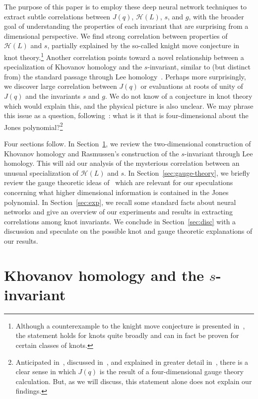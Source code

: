 \documentclass[11pt]{article}
\numberwithin{equation}{section}
\begin{document}
The purpose of this paper is to employ these deep neural network techniques to extract subtle correlations between $J(q)$, $\mathcal{H}(L)$, $s$, and $g$, with the broader goal of understanding the properties of each invariant that are surprising from a dimensional perspective.
We find strong correlation between properties of $\mathcal{H}(L)$ and $s$, partially explained by the so-called knight move conjecture in knot theory.\footnote{
Although a counterexample to the knight move conjecture is presented in~\cite{manolescu2018knight}, the statement holds for knots quite broadly and can in fact be proven for certain classes of knots.}
Another correlation points toward a novel relationship between a specialization of Khovanov homology and the $s$-invariant, similar to (but distinct from) the standard passage through Lee homology~\cite{rasmussen2010khovanov}.
Perhaps more surprisingly, we discover large correlation between $J(q)$ or evaluations at roots of unity of $J(q)$ and the invariants $s$ and $g$.
We do not know of a conjecture in knot theory which would explain this, and the physical picture is also unclear.
We may phrase this issue as a question, following~\cite{Witten:1988hf}: what is it that is four-dimensional about the Jones polynomial?\footnote{Anticipated in~\cite{Witten:2010cx,Witten:2010zr}, discussed in~\cite{Witten:2011zz}, and explained in greater detail in~\cite{Gaiotto:2011nm}, there is a clear sense in which $J(q)$ is the result of a four-dimensional gauge theory calculation.
But, as we will discuss, this statement alone does not explain our findings.}

Four sections follow.
In Section~\ref{sec:khovanov}, we review the two-dimensional construction of Khovanov homology and Rasmussen's construction of the $s$-invariant through Lee homology.
This will aid our analysis of the mysterious correlation between an unusual specialization of $\mathcal{H}(L)$ and $s$.
In Section~\ref{sec:gauge-theory}, we briefly review the gauge theoretic ideas of~\cite{Witten:1988hf,Witten:2011zz} which are relevant for our speculations concerning what higher dimensional information is contained in the Jones polynomial.
In Section~\ref{sec:exp}, we recall some standard facts about neural networks and give an overview of our experiments and results in extracting correlations among knot invariants.
We conclude in Section~\ref{sec:disc} with a discussion and speculate on the possible knot and gauge theoretic explanations of our results.


\section{Khovanov homology and the $s$-invariant}\label{sec:khovanov}
\end{document}
